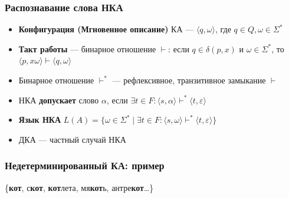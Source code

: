 \documentclass{beamer}
\begin{document}
\begin{frame}[fragile]
  \transwipe[direction=90]
  \frametitle{Распознавание слова НКА}
  \begin{itemize}
    \item \textbf{Конфигурация (Мгновенное описание)} КА --- $\langle q, \omega \rangle$, где $q \in Q, \omega \in \Sigma^*$
    \item \textbf{Такт работы} --- бинарное отношение $\vdash$: если $q \in \delta(p, x)$ и $\omega \in \Sigma ^*$, то $\langle p , x \omega \rangle \vdash \langle q , \omega \rangle$
    \item Бинарное отношение $\vdash^*$ --- рефлексивное, транзитивное замыкание $\vdash$
    \item НКА \textbf{допускает} слово $\alpha$, если $\exists t \in F : \langle s, \alpha \rangle \vdash^* \langle t, \varepsilon \rangle$
    \item \textbf{Язык НКА} $L(A) = \{ \omega \in \Sigma^* \mid \exists t \in F : \langle s, \omega \rangle \vdash^* \langle t, \varepsilon \rangle \}$ 
  \end{itemize}
  \begin{itemize}
    \item ДКА --- частный случай НКА
  \end{itemize}
\end{frame}

\begin{frame}[fragile]
  \transwipe[direction=90]
  \frametitle{Недетерминированный КА: пример} 
  
      \begin{center}
      \end{center}

\vspace{20pt}

  \begin{center}
    \{\textbf{кот}, с\textbf{кот}, \textbf{кот}лета, мя\textbf{кот}ь, антре\textbf{кот}\dots \}
  \end{center}
\end{frame}
\end{document}
